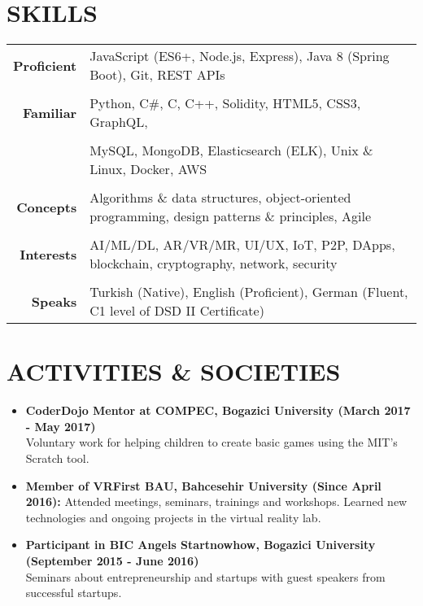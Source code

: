 \documentclass[a4paper, 10pt]{article}
\begin{document}
\section{SKILLS}
{\renewcommand{\arraystretch}{0.7}
\begin{tabular}{r p{15.4cm}}
    \textbf{Proficient} & JavaScript (ES6+, Node.js, Express), Java 8 (Spring Boot), Git, REST APIs\\\\
    \textbf{Familiar} & Python, C\#, C, C++, Solidity, HTML5, CSS3, GraphQL,\\\\
    & MySQL, MongoDB, Elasticsearch (ELK), Unix \& Linux, Docker, AWS\\\\
    \textbf{Concepts} & Algorithms \& data structures, object-oriented programming, design patterns \& principles, Agile\\\\
    \textbf{Interests} & AI/ML/DL, AR/VR/MR, UI/UX, IoT, P2P, DApps, blockchain, cryptography, network, security\\\\
    \textbf{Speaks} & Turkish (Native), English (Proficient), German (Fluent, C1 level of DSD II Certificate)
\end{tabular}}

\section{ACTIVITIES \& SOCIETIES}
\begin{itemize}
    \item \textbf{CoderDojo Mentor at COMPEC, Bogazici University (March 2017 - May 2017)}\\
        Voluntary work for helping children to create basic games using the MIT's Scratch tool.
    \item \textbf{Member of VRFirst BAU, Bahcesehir University (Since April 2016):}
        Attended meetings, seminars, trainings and workshops. Learned new technologies and ongoing projects in the virtual reality lab.
    \item \textbf{Participant in BIC Angels Startnowhow, Bogazici University (September 2015 - June 2016)}\\
        Seminars about entrepreneurship and startups with guest speakers from successful startups.
\end{itemize}
\end{document}
